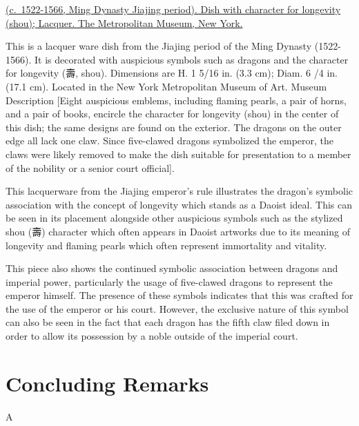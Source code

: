 \documentclass[
]{book}
\begin{document}
\href{https://www.metmuseum.org/art/collection/search/60870}{(c.~1522-1566, Ming Dynasty Jiajing period). Dish with character for longevity (shou); Lacquer. The Metropolitan Museum, New York.}

This is a lacquer ware dish from the Jiajing period of the Ming Dynasty (1522-1566). It is decorated with auspicious symbols such as dragons and the character for longevity (壽, shou). Dimensions are H. 1 5/16 in. (3.3 cm); Diam. 6 /4 in. (17.1 cm). Located in the New York Metropolitan Museum of Art. Museum Description {[}Eight auspicious emblems, including flaming pearls, a pair of horns, and a pair of books, encircle the character for longevity (shou) in the center of this dish; the same designs are found on the exterior. The dragons on the outer edge all lack one claw. Since five-clawed dragons symbolized the emperor, the claws were likely removed to make the dish suitable for presentation to a member of the nobility or a senior court official{]}.

This lacquerware from the Jiajing emperor's rule illustrates the dragon's symbolic association with the concept of longevity which stands as a Daoist ideal. This can be seen in its placement alongside other auspicious symbols such as the stylized shou (壽) character which often appears in Daoist artworks due to its meaning of longevity and flaming pearls which often represent immortality and vitality.

This piece also shows the continued symbolic association between dragons and imperial power, particularly the usage of five-clawed dragons to represent the emperor himself. The presence of these symbols indicates that this was crafted for the use of the emperor or his court. However, the exclusive nature of this symbol can also be seen in the fact that each dragon has the fifth claw filed down in order to allow its possession by a noble outside of the imperial court.

\hypertarget{conclusion}{%
\chapter*{Concluding Remarks}\label{conclusion}}

A

  
\end{document}
